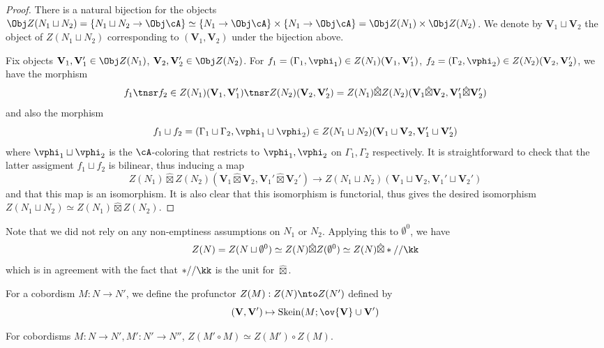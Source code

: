\documentclass[12pt]{article}
\newcommand{\empt}[1]{{\emptyset^{#1}}}
\newcommand{\VV}{{\mathbf{V}}}
\DeclareMathOperator{\Skein}{Skein}
\newcommand{\hatbox}{{\hat{\boxtimes}}}
\begin{document}
\begin{proof}
There is a natural bijection for the objects
$\Obj Z(N_1 \sqcup N_2) = \{N_1 \sqcup N_2 \to \Obj \cA\}
\simeq \{N_1 \to \Obj \cA\} \times \{N_1 \to \Obj \cA\}
= \Obj Z(N_1) \times \Obj Z(N_2)$.
We denote by $\VV_1 \sqcup \VV_2$ the object of $Z(N_1 \sqcup N_2)$
corresponding to $(\VV_1,\VV_2)$ under the bijection above.

Fix objects $\VV_1,\VV_1' \in \Obj Z(N_1)$,
$\VV_2,\VV_2' \in \Obj Z(N_2)$.
For $f_1 = (\Gamma_1,\vphi_1) \in Z(N_1)(\VV_1,\VV_1')$,
$f_2 = (\Gamma_2,\vphi_2) \in Z(N_2)(\VV_2,\VV_2')$,
we have the morphism
\[
f_1 \tnsr f_2 \in
Z(N_1)(\VV_1,\VV_1') \tnsr Z(N_2)(\VV_2,\VV_2')
= Z(N_1) \hatbox Z(N_2)(\VV_1 \hatbox \VV_2, \VV_1' \hatbox \VV_2')
\]
and also the morphism
\[
f_1 \sqcup f_2 = (\Gamma_1 \sqcup \Gamma_2, \vphi_1 \sqcup \vphi_2)
\in Z(N_1 \sqcup N_2) (\VV_1 \sqcup \VV_2, \VV_1' \sqcup \VV_2')
\]
where $\vphi_1 \sqcup \vphi_2$ is the $\cA$-coloring that
restricts to $\vphi_1,\vphi_2$ on $\Gamma_1,\Gamma_2$ respectively.
It is straightforward to check that
the latter assigment $f_1 \sqcup f_2$ is bilinear,
thus inducing a map
\[
Z(N_1) \hatbox Z(N_2)(\VV_1 \hatbox \VV_2, \VV_1' \hatbox \VV_2')
\to Z(N_1 \sqcup N_2) (\VV_1 \sqcup \VV_2, \VV_1' \sqcup \VV_2')
\]
and that this map is an isomorphism.
It is also clear that this isomorphism is functorial,
thus gives the desired isomorphism
$Z(N_1 \sqcup N_2) \simeq Z(N_1) \hatbox Z(N_2)$.
\end{proof}

Note that we did not rely on any non-emptiness assumptions
on $N_1$ or $N_2$.
Applying this to $\empt{0}$,
we have
\[
Z(N) = Z(N \sqcup \empt{0}) \simeq Z(N) \hatbox Z(\empt{0})
\simeq Z(N) \hatbox *//\kk
\]
which is in agreement with the fact that
$*//\kk$ is the unit for $\hatbox$.


\begin{definition}
For a cobordism $M : N \to N'$,
we define the profunctor
$Z(M): Z(N) \nto Z(N')$
defined by
\[
(\VV, \VV') \mapsto \Skein(M; \ov{\VV} \cup \VV')
\]
\end{definition}

\begin{proposition}
\label{p:1-cobord-compose}
For cobordisms $M: N \to N', M': N' \to N''$,
$Z(M' \circ M) \simeq Z(M') \circ Z(M)$.
\end{proposition}
\end{document}
